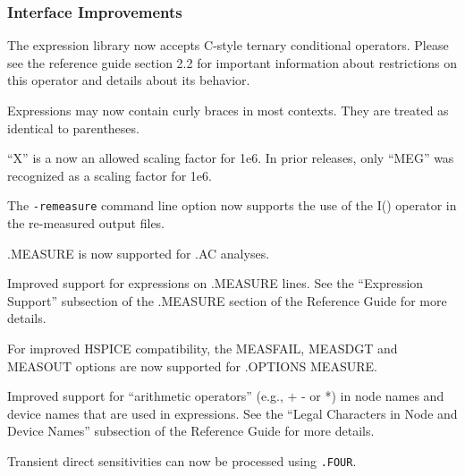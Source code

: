 \documentclass[letterpaper]{scrartcl}
\begin{document}
\subsubsection*{Interface Improvements}
\begin{XyceItemize}
\item The \Xyce{} expression library now accepts C-style ternary
  conditional operators.  Please see the reference guide section 2.2
  for important information about restrictions on this operator and
  details about its behavior.
\item Expressions may now contain curly braces in most contexts.  They
  are treated as identical to parentheses.
\item ``X'' is a now an allowed scaling factor for 1e6.  In prior \Xyce{}
  releases, only ``MEG'' was recognized as a scaling factor for 1e6.
\item The \texttt{-remeasure} command line option now supports the use 
of the I() operator in the re-measured output files.
\item .MEASURE is now supported for .AC analyses.
\item Improved support for expressions on .MEASURE lines.  See the ``Expression
Support'' subsection of the .MEASURE section of the \Xyce{} Reference Guide 
for more details.
\item For improved HSPICE compatibility, the MEASFAIL, MEASDGT and MEASOUT
options are now supported for .OPTIONS MEASURE.
\item Improved support for ``arithmetic operators'' (e.g., + - or *) in node names
and device names that are used in expressions. See the ``Legal Characters in Node
and Device Names'' subsection of the \Xyce{} Reference Guide for more details.
\item Transient direct sensitivities can now be processed using \texttt{.FOUR}.
\end{XyceItemize}
\end{document}

